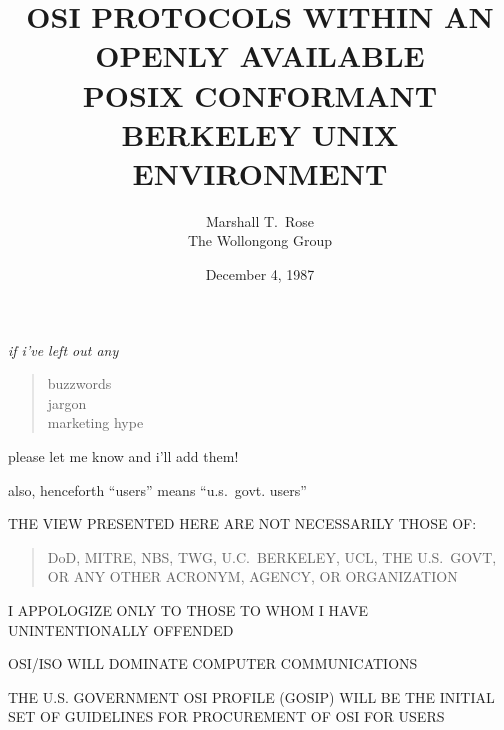 

 

\raggedright



\title	{OSI PROTOCOLS WITHIN AN\\
	OPENLY AVAILABLE\\ POSIX CONFORMANT\\ BERKELEY UNIX ENVIRONMENT}
\author	{Marshall T.~Rose\\The Wollongong Group}
\date	{December 4, 1987}
\maketitlepage


\begin{note}\em
if i've left out any 
\begin{quote}
buzzwords\\
jargon\\
marketing hype\\
\end{quote}
please let me know and i'll add them!

also, henceforth ``users'' means ``u.s.~govt. users''
\end{note}


\begin{bwslide}

\begin{nrtc}
\item	THE VIEW PRESENTED HERE ARE NOT NECESSARILY THOSE OF:
\begin{quote}
DoD, MITRE, NBS, TWG, U.C.~BERKELEY, UCL, THE U.S.~GOVT,
OR ANY OTHER ACRONYM, AGENCY, OR ORGANIZATION
\end{quote}

\item	I APPOLOGIZE ONLY TO THOSE TO WHOM I HAVE UNINTENTIONALLY OFFENDED
\end{nrtc}
\end{bwslide}


\begin{bwslide}

\begin{nrtc}
\item	OSI/ISO WILL DOMINATE COMPUTER COMMUNICATIONS

\item	THE U.S. GOVERNMENT OSI PROFILE (GOSIP) WILL BE THE INITIAL SET OF
	GUIDELINES FOR PROCUREMENT OF OSI FOR USERS
\end{nrtc}
\end{bwslide}


